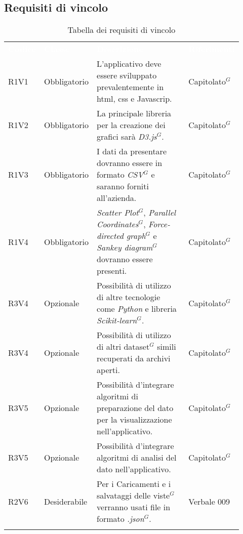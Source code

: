 \subsection{Requisiti di vincolo}
{\renewcommand{\arraystretch}{1.5}
\begin{longtable}{p{0.12\linewidth}p{0.15\linewidth}p{0.50\linewidth}p{0.15\linewidth}}
	\rowcolor[RGB]{33, 73, 50}
	\textcolor{white}{\textbf{Codice}} & \textcolor{white}{\textbf{Classe}} & \textcolor{white}{\textbf{Descrizione}} &
    \textcolor{white}{\textbf{Riferimenti}}\\
    
    \rowcolor[RGB]{216, 235, 171}
    R1V1 & Obbligatorio & L'applicativo deve essere sviluppato prevalentemente in html, css e Javascrip. & Capitolato$^{G}$\\
    \rowcolor[RGB]{233, 245, 206}
    R1V2 & Obbligatorio & La principale libreria per la creazione dei grafici sarà \textit{D3.js}$^{G}$. & Capitolato$^{G}$\\
    \rowcolor[RGB]{216, 235, 171}
    R1V3 & Obbligatorio & I dati da presentare dovranno essere in formato \textit{CSV}$^{G}$ e saranno forniti all'azienda.& Capitolato$^{G}$\\
    \rowcolor[RGB]{233, 245, 206}
    R1V4 & Obbligatorio & \textit{Scatter Plot}$^{G}$, \textit{Parallel Coordinates}$^{G}$, \textit{Force-directed graph}$^{G}$ e \textit{Sankey diagram}$^{G}$ dovranno essere presenti.& Capitolato$^{G}$\\
    \rowcolor[RGB]{216, 235, 171}
    R3V4 & Opzionale & Possibilità di utilizzo di altre tecnologie come \textit{Python} e libreria \textit{Scikit-learn}$^{G}$.& Capitolato$^{G}$\\
    \rowcolor[RGB]{233, 245, 206}
    R3V4 & Opzionale & Possibilità di utilizzo di altri dataset$^{G}$ simili recuperati da archivi aperti. & Capitolato$^{G}$ \\ 
    \rowcolor[RGB]{216, 235, 171}
    R3V5 & Opzionale & Possibilità d'integrare algoritmi di preparazione del dato per la visualizzazione nell'applicativo. & Capitolato$^{G}$\\
    \rowcolor[RGB]{233, 245, 206}
    R3V5 & Opzionale & Possibilità d'integrare algoritmi di analisi del dato nell'applicativo. & Capitolato$^{G}$\\
    \rowcolor[RGB]{216, 235, 171}
    R2V6 & Desiderabile & Per i Caricamenti e i salvataggi delle viste$^{G}$ verranno usati file in formato \textit{.json}$^{G}$. & Verbale 009\\
    
    \caption{Tabella dei requisiti di vincolo}
\end{longtable}	
}

